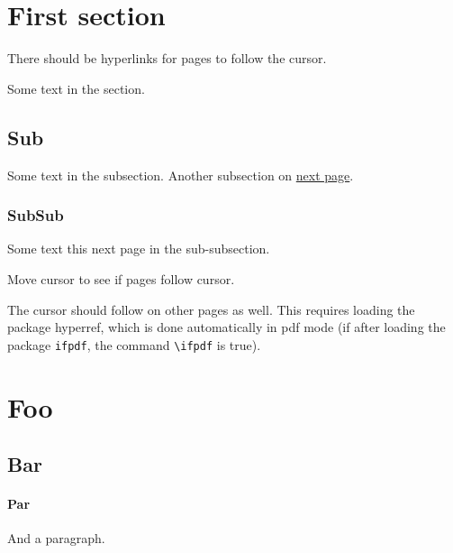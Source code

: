\documentclass{article}
\begin{document}
\section{First section}

There should be hyperlinks for pages to follow the cursor. 

\tableofcontents


Some text in the section.  
 
\subsection {Sub}

Some text in the subsection. 
Another subsection on \hyperlink{next}{next page}.

\newpage

\subsubsection {SubSub} 

Some text this \hypertarget{next}{next page} in the sub-subsection. 

Move cursor to see if pages follow cursor.

\newpage

The cursor should follow on other pages as well.
This requires loading the package hyperref, which is done
automatically in pdf mode (if after loading the package \texttt{ifpdf}, 
the command \verb"\ifpdf" is true). 



\section{Foo}

\subsection {Bar}


\paragraph {Par}

And a paragraph.
\end{document}
